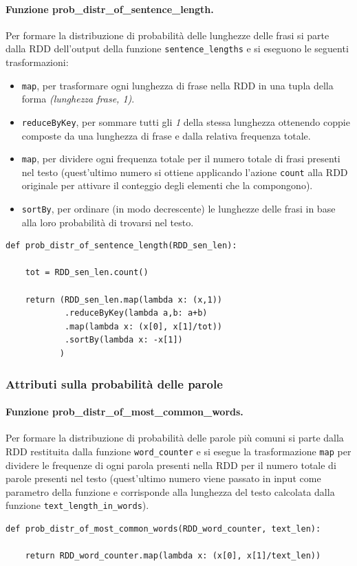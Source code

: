 \documentclass[titlepage]{article}
\begin{document}
\paragraph{Funzione prob\_distr\_of\_sentence\_length.}
Per formare la distribuzione di probabilità delle lunghezze delle frasi si parte dalla RDD dell'output della funzione \texttt{sentence\_lengths} e si eseguono le seguenti trasformazioni:
\begin{itemize}
    \item \texttt{map}, per trasformare ogni lunghezza di frase nella RDD in una tupla della forma \textit{(lunghezza frase, 1)}.
    \item \texttt{reduceByKey}, per sommare tutti gli \textit{1} della stessa lunghezza ottenendo coppie composte da una lunghezza di frase e dalla relativa frequenza totale.
    \item \texttt{map}, per dividere ogni frequenza totale per il numero totale di frasi presenti nel testo (quest'ultimo numero si ottiene applicando l'azione \texttt{count} alla RDD originale per attivare il conteggio degli elementi che la compongono).
    \item \texttt{sortBy}, per ordinare (in modo decrescente) le lunghezze delle frasi in base alla loro probabilità di trovarsi nel testo.
\end{itemize}
\begin{verbatim}
def prob_distr_of_sentence_length(RDD_sen_len):
    
    tot = RDD_sen_len.count()

    return (RDD_sen_len.map(lambda x: (x,1))
            .reduceByKey(lambda a,b: a+b)
            .map(lambda x: (x[0], x[1]/tot))
            .sortBy(lambda x: -x[1])
           )
\end{verbatim}

\newpage
\subsubsection{Attributi sulla probabilità delle parole}
\paragraph{Funzione prob\_distr\_of\_most\_common\_words.}
Per formare la distribuzione di probabilità delle parole più comuni si parte dalla RDD restituita dalla funzione \texttt{word\_counter} e si esegue la trasformazione \texttt{map} per dividere le frequenze di ogni parola presenti nella RDD per il numero totale di parole presenti nel testo (quest'ultimo numero viene passato in input come parametro della funzione e corrisponde alla lunghezza del testo calcolata dalla funzione \texttt{text\_length\_in\_words}).
\begin{verbatim}
def prob_distr_of_most_common_words(RDD_word_counter, text_len):
    
    return RDD_word_counter.map(lambda x: (x[0], x[1]/text_len))
\end{verbatim}
\end{document}
